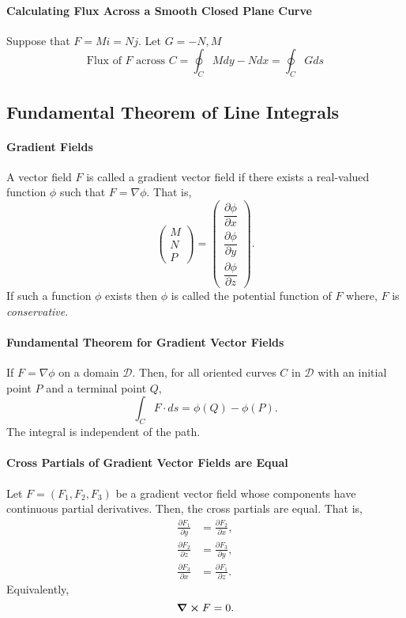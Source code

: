 \paragraph{Calculating Flux Across a Smooth Closed Plane Curve}
Suppose that \(F = Mi = Nj\). Let \(G = -N, M\)
\[
\text{Flux of \(F\) across \(C\)} = 
\oint_C M dy - N dx = \oint_C G ds
\]

\subsection{Fundamental Theorem of Line Integrals}

\paragraph{Gradient Fields}
A vector field \(F\) is called a gradient vector field if there
exists a real-valued function \(\phi\) such that
\(F = \nabla \phi\). 
That is,
\[
    \begin{pmatrix} M \\ N \\ P \end{pmatrix}
    =
    \begin{pmatrix}
        \dfrac{\partial \phi}{\partial x} \\
        \dfrac{\partial \phi}{\partial y} \\
        \dfrac{\partial \phi}{\partial z}
    \end{pmatrix}.
\]
If such a function \(\phi\) exists then \(\phi\) is called the potential function of \(F\)
where, \(F\) is \textit{conservative}.

\paragraph{Fundamental Theorem for Gradient Vector Fields}
If \(F = \nabla \phi\) on a domain \(\mathcal{D}\). Then,
for all oriented curves \(C\) in \(\mathcal{D}\) with an initial
point \(P\) and a terminal point \(Q\),
\[
    \int_C F\cdot ds = \phi(Q) - \phi(P).
\]
The integral is independent of the path.

\paragraph{Cross Partials of Gradient Vector Fields are Equal}
Let \(F = (F_1, F_2, F_3)\) be a gradient vector field whose
components have continuous partial derivatives.
Then, the cross partials are equal. That is,
\begin{align*}
    \frac{\partial F_1}{\partial y} &= \frac{\partial F_2}{\partial x},\\
    \frac{\partial F_2}{\partial z} &= \frac{\partial F_3}{\partial y},\\
    \frac{\partial F_3}{\partial x} &= \frac{\partial F_1}{\partial z}.
\end{align*}
Equivalently,
\[\curl F = 0.\]

